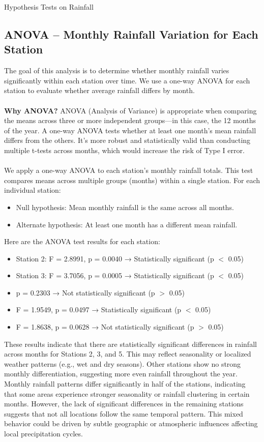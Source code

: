 \documentclass[12pt]{article}
\theoremstyle{definition}
\begin{document}
\begin{section}{Hypothesis Tests on Rainfall}
\subsection{ANOVA – Monthly Rainfall Variation for Each Station}
The goal of this analysis is to determine whether monthly rainfall varies significantly within each station over time. We use a one-way ANOVA for each station to evaluate whether average rainfall differs by month.\\ \\
\textbf{Why ANOVA?} ANOVA (Analysis of Variance) is appropriate when comparing the means across three or more independent groups—in this case, the 12 months of the year. A one-way ANOVA tests whether at least one month's mean rainfall differs from the others. It’s more robust and statistically valid than conducting multiple t-tests across months, which would increase the risk of Type I error.\\ \\

We apply a one-way ANOVA to each station’s monthly rainfall totals. This test compares means across multiple groups (months) within a single station. For each individual station:
\begin{itemize}
    \item Null hypothesis: Mean monthly rainfall is the same across all months.
    \item Alternate hypothesis: At least one month has a different mean rainfall.\\
\end{itemize}

Here are the ANOVA test results for each station:
\begin{itemize}
    \item Station 2: F = 2.8991, p = 0.0040 → Statistically significant (p $<$ 0.05)
    \item Station 3: F = 3.7056, p = 0.0005 → Statistically significant (p $<$ 0.05)
    \item p = 0.2303 → Not statistically significant (p $>$ 0.05)
    \item F = 1.9549, p = 0.0497 → Statistically significant (p $<$ 0.05)
    \item F = 1.8638, p = 0.0628 → Not statistically significant (p $>$ 0.05)
\end{itemize}

These results indicate that there are statistically significant differences in rainfall across months for Stations 2, 3, and 5. This may reflect seasonality or localized weather patterns (e.g., wet and dry seasons). Other stations show no strong monthly differentiation, suggesting more even rainfall throughout the year. Monthly rainfall patterns differ significantly in half of the stations, indicating that some areas experience stronger seasonality or rainfall clustering in certain months. However, the lack of significant differences in the remaining stations suggests that not all locations follow the same temporal pattern. This mixed behavior could be driven by subtle geographic or atmospheric influences affecting local precipitation cycles.


\end{section}
\end{document}
